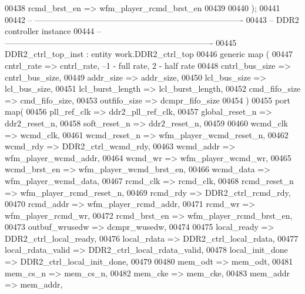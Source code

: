 \begin{DoxyCode}
00438         rcmd_brst_en            => wfm_player_rcmd_brst_en
00439 
00440         \textcolor{vhdlchar}{)};
00441 
00442 \textcolor{keyword}{-- ----------------------------------------------------------------------------}
00443 \textcolor{keyword}{-- DDR2 controller instance}
00444 \textcolor{keyword}{-- ----------------------------------------------------------------------------}
00445   DDR2\_ctrl\_top\_inst : \textcolor{keywordflow}{entity} work.DDR2_ctrl_top 
00446 \textcolor{keywordflow}{generic} \textcolor{keywordflow}{map} (
00447             cntrl_rate          => cntrl_rate,\textcolor{keyword}{ --1 - full rate, 2 - half rate}
00448             cntrl_bus_size      => cntrl_bus_size,
00449             addr_size           => addr_size,
00450             lcl_bus_size        => lcl_bus_size,
00451             lcl_burst_length    => lcl_burst_length,
00452             cmd_fifo_size       => cmd_fifo_size,
00453             outfifo_size        => dcmpr_fifo_size
00454 \textcolor{vhdlchar}{)}
00455 \textcolor{keywordflow}{port} \textcolor{keywordflow}{map}(
00456       pll_ref_clk           => ddr2_pll_ref_clk,
00457       global_reset_n        => ddr2_reset_n,
00458         soft_reset_n            => ddr2_reset_n,
00459 
00460         wcmd_clk                    => wcmd_clk, 
00461         wcmd_reset_n            => wfm_player_wcmd_reset_n, 
00462         wcmd_rdy                    => DDR2_ctrl_wcmd_rdy, 
00463         wcmd_addr               => wfm_player_wcmd_addr, 
00464         wcmd_wr                 => wfm_player_wcmd_wr, 
00465         wcmd_brst_en            => wfm_player_wcmd_brst_en, 
00466         wcmd_data               => wfm_player_wcmd_data, 
00467         rcmd_clk                    => rcmd_clk, 
00468         rcmd_reset_n            => wfm_player_rcmd_reset_n, 
00469         rcmd_rdy                    => DDR2_ctrl_rcmd_rdy, 
00470         rcmd_addr               => wfm_player_rcmd_addr, 
00471         rcmd_wr                 => wfm_player_rcmd_wr, 
00472         rcmd_brst_en            => wfm_player_rcmd_brst_en,
00473         outbuf_wrusedw          => dcmpr_wusedw,    
00474 
00475         local_ready             => DDR2_ctrl_local_ready,
00476         local_rdata             => DDR2_ctrl_local_rdata,
00477         local_rdata_valid       => DDR2_ctrl_local_rdata_valid,
00478         local_init_done     => DDR2_ctrl_local_init_done,
00479 
00480         mem_odt                 => mem_odt,
00481         mem_cs_n                    => mem_cs_n,
00482         mem_cke                 => mem_cke,
00483         mem_addr                    => mem_addr,

\end{DoxyCode}
